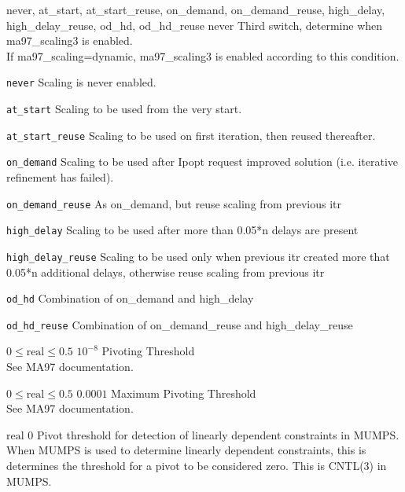 %
{\ttfamily never, at\_start, at\_start\_reuse, on\_demand, on\_demand\_reuse, high\_delay, high\_delay\_reuse, od\_hd, od\_hd\_reuse}%
{never}%
{Third switch, determine when ma97\_scaling3 is enabled.\\
If ma97\_scaling=dynamic, ma97\_scaling3 is enabled according to this condition.}%
{\begin{list}{}{
\setlength{\parsep}{0em}
\setlength{\leftmargin}{5ex}
\setlength{\labelwidth}{2ex}
\setlength{\itemindent}{0ex}
\setlength{\topsep}{0pt}}
\item[\texttt{never}] Scaling is never enabled.
\item[\texttt{at\_start}] Scaling to be used from the very start.
\item[\texttt{at\_start\_reuse}] Scaling to be used on first iteration, then reused thereafter.
\item[\texttt{on\_demand}] Scaling to be used after Ipopt request improved solution (i.e. iterative refinement has failed).
\item[\texttt{on\_demand\_reuse}] As on\_demand, but reuse scaling from previous itr
\item[\texttt{high\_delay}] Scaling to be used after more than 0.05*n delays are present
\item[\texttt{high\_delay\_reuse}] Scaling to be used only when previous itr created more that 0.05*n additional delays, otherwise reuse scaling from previous itr
\item[\texttt{od\_hd}] Combination of on\_demand and high\_delay
\item[\texttt{od\_hd\_reuse}] Combination of on\_demand\_reuse and high\_delay\_reuse
\end{list}
}

%
{$0\leq\textrm{real}\leq0.5$}%
{$10^{- 8}$}%
{Pivoting Threshold\\
See MA97 documentation.}%
{}

%
{$0\leq\textrm{real}\leq0.5$}%
{$0.0001$}%
{Maximum Pivoting Threshold\\
See MA97 documentation.}%
{}

%
{$\textrm{real}$}%
{$0$}%
{Pivot threshold for detection of linearly dependent constraints in MUMPS.\\
When MUMPS is used to determine linearly dependent constraints, this is determines the threshold for a pivot to be considered zero.  This is CNTL(3) in MUMPS.}%
{}

